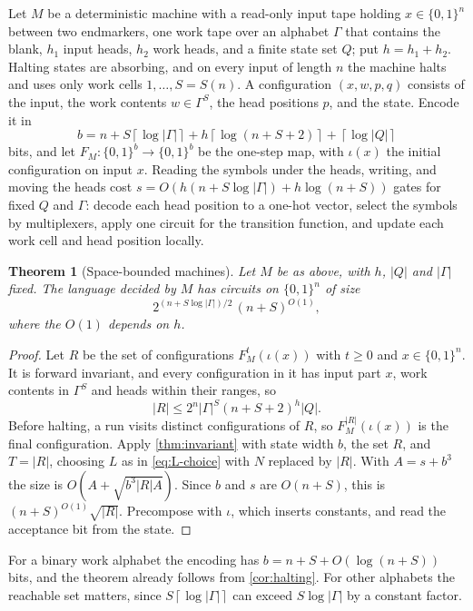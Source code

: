 \documentclass[11pt]{article}
\newtheorem{theorem}{Theorem}[section]
\theoremstyle{definition}
\theoremstyle{remark}
\newcommand{\bits}{\{0,1\}}
\newcommand{\ceil}[1]{\left\lceil #1\right\rceil}
\numberwithin{equation}{section}
\begin{document}
Let $M$ be a deterministic machine with a read-only input tape holding
$x\in\bits^n$ between two endmarkers, one work tape over an alphabet
$\Gamma$ that contains the blank, $h_1$ input heads, $h_2$ work heads,
and a finite state set $Q$; put $h=h_1+h_2$.  Halting states are
absorbing, and on every input of length $n$ the machine halts and uses
only work cells $1,\ldots,S=S(n)$.  A configuration
$(x,w,p,q)$ consists of the input, the work contents $w\in\Gamma^S$, the
head positions $p$, and the state.  Encode it in
\[
  b=n+S\ceil{\log|\Gamma|}+h\ceil{\log(n+S+2)}+\ceil{\log|Q|}
\]
bits, and let $F_M:\bits^b\to\bits^b$ be the one-step map, with
$\iota(x)$ the initial configuration on input $x$.  Reading the symbols
under the heads, writing, and moving the heads cost
$s=O(h(n+S\log|\Gamma|)+h\log(n+S))$ gates for fixed $Q$ and $\Gamma$:
decode each head position to a one-hot vector, select the symbols by
multiplexers, apply one circuit for the transition function, and
update each work cell and head position locally.

\begin{theorem}[Space-bounded machines]\label{thm:space-bounded}
Let $M$ be as above, with $h$, $|Q|$ and $|\Gamma|$ fixed.  The language
decided by $M$ has circuits on $\bits^n$ of size
\[
  2^{(n+S\log|\Gamma|)/2}\,(n+S)^{O(1)},
\]
where the $O(1)$ depends on $h$.
\end{theorem}

\begin{proof}
Let $R$ be the set of configurations $F_M^t(\iota(x))$ with $t\geq0$ and
$x\in\bits^n$.  It is forward invariant, and every configuration in it
has input part $x$, work contents in $\Gamma^S$ and heads within their
ranges, so
\[
  |R|\leq 2^n|\Gamma|^S(n+S+2)^h|Q|.
\]
Before halting, a run visits distinct configurations of $R$, so
$F_M^{|R|}(\iota(x))$ is the final configuration.  Apply
\cref{thm:invariant} with state width $b$, the set $R$, and $T=|R|$,
choosing $L$ as in \cref{eq:L-choice} with $N$ replaced by $|R|$.  With
$A=s+b^3$ the size is $O(A+\sqrt{b^3|R|A})$.  Since $b$ and $s$ are
$O(n+S)$, this is $(n+S)^{O(1)}\sqrt{|R|}$.  Precompose with $\iota$,
which inserts constants, and read the acceptance bit from the state.
\end{proof}

For a binary work alphabet the encoding has $b=n+S+O(\log(n+S))$ bits,
and the theorem already follows from \cref{cor:halting}.  For other
alphabets the reachable set matters, since $S\ceil{\log|\Gamma|}$ can
exceed $S\log|\Gamma|$ by a constant factor.
\end{document}
